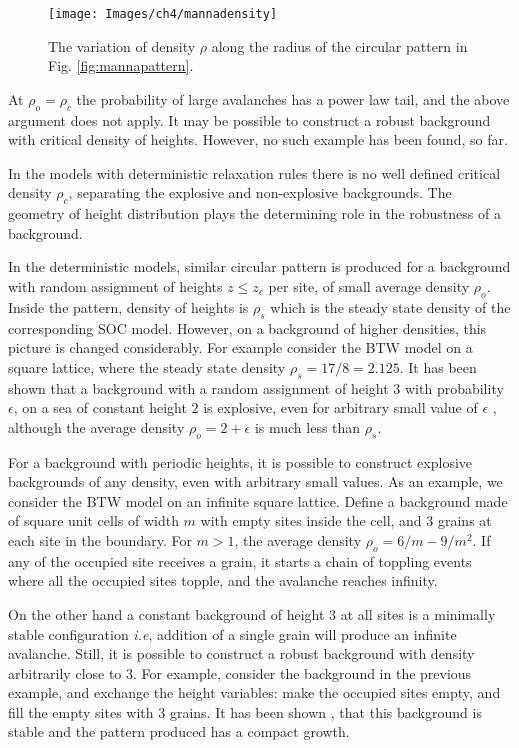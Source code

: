 \documentclass[11pt,a4paper]{book}
\begin{document}
\begin{SCfigure}
\texttt{[image: Images/ch4/mannadensity]}
\caption{The variation of density $\rho$ along the radius of the
circular pattern in Fig. \ref{fig:mannapattern}.}
\label{fig:transition}
\end{SCfigure}

At $\rho_{o}=\rho_{c}$ the probability of large avalanches has a power
law tail, and the above argument does not apply. It may be possible to
construct a robust background with critical density of heights. However, no such example has been
found, so far.

In the models with deterministic relaxation rules there is no well defined
critical density $\rho_{c}$, separating the explosive and
non-explosive backgrounds. The geometry of height distribution plays
the determining role in the robustness of a background.

In the deterministic models, similar circular pattern is produced for a background with random assignment of
heights $z\le z_{c}$ per site, of small average density $\rho_{o}$.
Inside the pattern, density of heights is $\rho_{s}$ which is the steady
state density of the corresponding SOC model.
However, on a background of higher densities, this picture is changed
considerably.
For example consider the BTW model on a square lattice, where the steady state density $\rho_{s}=17/8=2.125$.
It has been shown that a background with a random assignment of height $3$ with probability $\epsilon$, on
a sea of constant height $2$ is explosive, even for arbitrary
small value of $\epsilon$ \cite{explosion}, although
the average density $\rho_{o}=2+\epsilon$ is much less than $\rho_{s}$. 

For a background with periodic heights, it is possible to construct
explosive backgrounds of any density, even with arbitrary small
values. As an example, we consider the BTW model on an infinite square lattice. Define a background made of square unit cells of width $m$ with
empty sites inside the cell, and $3$ grains at each site in the
boundary. For $m>1$, the average density
$\rho_{o}=6/m-9/m^{2}$. If any of the occupied site receives a grain, it starts a chain of toppling events where
all the occupied sites topple, and the avalanche reaches infinity.

On the other hand a constant background of height $3$ at all sites is
a minimally stable configuration \textit{i.e}, addition of a single
grain will produce an infinite avalanche.
Still, it is possible to construct a robust background with density arbitrarily
close to $3$. For example, consider the background in the previous
example, and exchange the height variables: make the occupied
sites empty, and fill the empty sites with $3$ grains. It has been
shown \cite{explosion}, that this background is stable and the
pattern produced has a compact growth.
\end{document}

